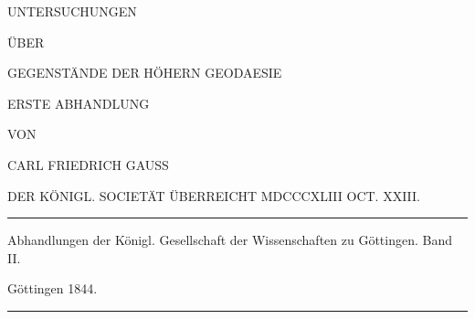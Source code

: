 \clearpage
{}
\thispagestyle{empty}
\vspace*{.3in}
\begin{center}
{\large UNTERSUCHUNGEN}\par\bigskip
ÜBER\par\bigskip
{\Large GEGENSTÄNDE DER HÖHERN GEODAESIE}\par\vspace{25pt}
ERSTE ABHANDLUNG\par\vspace{35pt}
VON\par\vspace{35pt}
{\large CARL FRIEDRICH GAUSS}\par\vspace{35pt}
{\small DER KÖNIGL. SOCIETÄT ÜBERREICHT MDCCCXLIII OCT. XXIII.}
\end{center}
\vfill
\begin{center}
\rule{.8\linewidth}{.3pt}\par\smallskip
Abhandlungen der Königl. Gesellschaft der Wissenschaften zu Göttingen. Band II.\par
Göttingen 1844.\par\smallskip
\rule{.8\linewidth}{.3pt}
\end{center}
\clearpage
